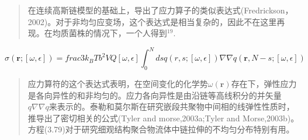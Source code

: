 \begin{quotation}
	在连续高斯链模型的基础上，导出了应力算子的类似表达式(Fredrickson，2002)。对于非均匀应变场，这个表达式是相当复杂的，因此不在这里再现。在均质菌株的情况下，一个人得到$^{19}$.
\end{quotation}
\begin{equation}\label{34}
\sigma(\mathbf{r};[\omega,\epsilon])=frac{3k_BT}{b^2VQ[\omega,\epsilon]}\int_{0}^{N} ds q(r,s;[\omega,\epsilon])\nabla \nabla q(\mathbf{r},N-s;[\omega,\epsilon])
\end{equation}
\begin{quotation}
	应力算符的这个表达式表明，在空间变化的化学势$\omega(\mathbf{r})$存在下，弹性应力是各向异性的和非均匀的。应力各向异性是由沿链等高线积分的并矢量$q\nabla \nabla q$来表示的。泰勒和莫尔斯在研究嵌段共聚物中间相的线弹性性质时，推导出了密切相关的公式(Tyler and morse,2003a;Tyler and Morse,2003b)。方程(3.79)对于研究细观结构聚合物流体中链拉伸的不均匀分布特别有用。
\end{quotation}

